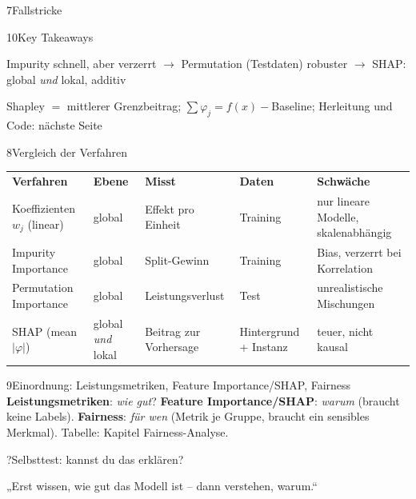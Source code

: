 \begin{hngrid}
\begin{hnp}[raster multicolumn=3,acc=hnpurple]{7}{Fallstricke}
\begin{hncon}
\end{hncon}
\end{hnp}
%
\begin{hnp}[raster multicolumn=3,acc=hnorange]{10}{Key Takeaways}
\begin{hnchk}
\item Impurity schnell, aber verzerrt $\to$ Permutation (Testdaten) robuster $\to$ SHAP: global \emph{und} lokal, additiv
\item Shapley $=$ mittlerer Grenzbeitrag; $\sum\varphi_j=f(x)-$Baseline; Herleitung und Code: nächste Seite
\end{hnchk}
\end{hnp}
%
\begin{hnp}[raster multicolumn=6,acc=hnnavy]{8}{Vergleich der Verfahren}
\setlength{\tabcolsep}{2.4pt}\renewcommand{\arraystretch}{1.3}\fontsize{\hntabsz}{\hntablead}\selectfont
\begin{tabular}{@{}>{\raggedright\arraybackslash}p{3.3cm}>{\raggedright\arraybackslash}p{2.3cm}>{\raggedright\arraybackslash}p{3.0cm}>{\raggedright\arraybackslash}p{3.3cm}>{\raggedright\arraybackslash}p{4.4cm}@{}}
\rowcolor{hnnavy!12}\textbf{Verfahren}&\textbf{Ebene}&\textbf{Misst}&\textbf{Daten}&\textbf{Schwäche}\\
Koeffizienten $w_j$ (linear)&global&Effekt pro Einheit&Training&nur lineare Modelle, skalenabhängig\\
Impurity Importance&global&Split-Gewinn&Training&Bias, verzerrt bei Korrelation\\
Permutation Importance&global&Leistungsverlust&Test&unrealistische Mischungen\\
SHAP (mean $|\varphi|$)&global \emph{und} lokal&Beitrag zur Vorhersage&Hintergrund + Instanz&teuer, nicht kausal\\
\end{tabular}
\end{hnp}
%
\begin{hnp}[raster multicolumn=6,acc=hnteal]{9}{Einordnung: Leistungsmetriken, Feature Importance/SHAP, Fairness}
\textbf{Leistungsmetriken}: \emph{wie gut}? \textbf{Feature Importance/SHAP}: \emph{warum} (braucht keine Labels). \textbf{Fairness}: \emph{für wen} (Metrik je Gruppe, braucht ein sensibles Merkmal). Tabelle: Kapitel Fairness-Analyse.
\end{hnp}
%
\begin{hnp}[raster multicolumn=6,acc=hnpurple,colback=hnlilac!30]{?}{Selbsttest: kannst du das erklären?}
\end{hnp}
%
\begin{hnbanner}[raster multicolumn=6]
„Erst wissen, wie gut das Modell ist -- dann verstehen, warum.“
\end{hnbanner}
\end{hngrid}
